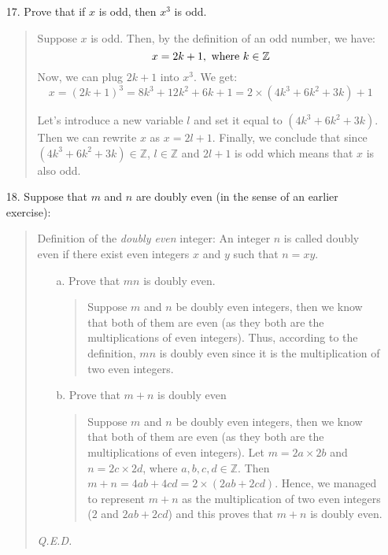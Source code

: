 \documentclass[12pt, a4paper]{article}             %
\begin{document}
\begin{enumerate}
\item[17.]
Prove that if $x$ is odd, then $x^3$ is odd.

\begin{quote}
Suppose $x$ is odd. Then, by the definition of an odd number, we have:
$$x = 2k + 1, \ \textnormal{where} \ k \in \mathbb{Z}$$
Now, we can plug $2k + 1$ into $x^3$. We get:
$$
x = (2k + 1)^3 = 8k^3 + 12k^2 + 6k + 1 = 2 \times (4k^3 + 6k^2 + 3k) + 1
$$

Let's introduce a new variable $l$ and set it equal to $(4k^3 + 6k^2 + 3k)$.
Then we can rewrite $x$ as $x = 2l + 1$. Finally, we conclude that since
$(4k^3 + 6k^2 + 3k) \in \mathbb{Z}$, $l \in \mathbb{Z}$ and $2l + 1$ is odd which
means that $x$ is also odd.
\end{quote}

\item[18.]
Suppose that $m$ and $n$ are doubly even (in the sense of an earlier exercise):
\begin{quote}
Definition of the \textit{doubly even} integer: An integer $n$ is called doubly even if there exist even integers $x$ and $y$ such that $n = xy$.\\

\begin{itemize}
\item[a.]
Prove that $mn$ is doubly even.
\begin{quote}
Suppose $m$ and $n$ be doubly even integers, then we know that both of them are even (as they both are the multiplications of even integers).
Thus, according to the definition, $mn$ is doubly even since it is the multiplication of two even integers.
\end{quote}

\item[b.]
Prove that $m + n$ is doubly even
\begin{quote}
Suppose $m$ and $n$ be doubly even integers, then we know that both of them are even (as they both are the multiplications of even integers).
Let $m = 2a \times 2b$ and $n = 2c \times 2d$, where $a,b,c,d \in \mathbb{Z}$. Then $m + n = 4ab + 4cd = 2 \times (2ab + 2cd)$. Hence, we managed to represent
$m + n$ as the multiplication of two even integers ($2$ and $2ab + 2cd$) and this proves that $m + n$ is doubly even.
\end{quote}
\end{itemize}
\begin{flushright}
\textit{Q.E.D.}
\end{flushright}
\end{quote}


\end{enumerate}
\end{document}
